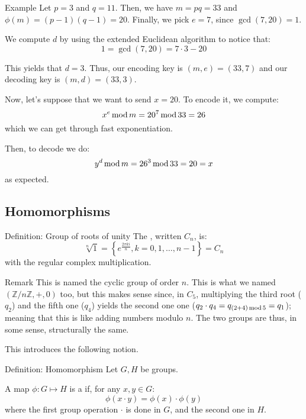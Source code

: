 \documentclass[a4paper]{article}
\begin{document}
\begin{parag}{Example}
    Let $p = 3$ and $q = 11$. Then, we have $m = pq = 33$ and $\phi\left(m\right) = \left(p-1\right)\left(q-1\right) = 20$. Finally, we pick $e = 7$, since $\gcd\left(7, 20\right) = 1$.

    We compute $d$ by using the extended Euclidean algorithm to notice that: 
    \[1 = \gcd\left(7, 20\right) = 7\cdot 3 - 20\]
    
    This yields that $d = 3$. Thus, our encoding key is $\left(m, e\right) = \left(33, 7\right)$ and our decoding key is $\left(m, d\right) = \left(33, 3\right)$.

    Now, let's suppose that we want to send $x = 20$. To encode it, we compute: 
    \[x^e \operatorname{mod} m = 20^7 \operatorname{mod} 33 = 26 \]
    which we can get through fast exponentiation.
    
    Then, to decode we do: 
    \[y^d \operatorname{mod} m = 26^3 \operatorname{mod} 33 = 20 = x\]
    as expected.
\end{parag}

\subsection{Homomorphisms}

\begin{parag}{Definition: Group of roots of unity}
    The , written $C_n$, is: 
    \[\sqrt[n]{1} = \left\{e^{\frac{2\pi k i}{n}}, k = 0, 1, \ldots, n-1\right\} = C_n\]
    with the regular complex multiplication.
    
    \begin{subparag}{Remark}
        This is named the cyclic group of order $n$. This is what we named $\left(\mathbb{Z}/n\mathbb{Z}, +, 0\right)$ too, but this makes sense since, in $C_5$, multiplying the third root ($q_2$) and the fifth one ($q_4$) yields the second one one ($q_2 \cdot  q_4 = q_{\left(2 + 4\right) \Mod 5} = q_{1}$); meaning that this is like adding numbers modulo $n$. The two groups are thus, in some sense, structurally the same.

        This introduces the following notion.
    \end{subparag}
\end{parag}

\begin{parag}{Definition: Homomorphism}
    Let $G, H$ be groups.

    A map $\phi: G \mapsto H$ is a  if, for any $x, y \in G$: 
    \[\phi\left(x\cdot y\right) = \phi\left(x\right)\cdot \phi\left(y\right)\]
    where the first group operation $\cdot $ is done in $G$, and the second one in $H$.
\end{parag}
\end{document}
